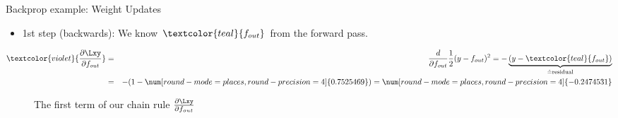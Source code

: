 \begin{vbframe}{Backprop example: Weight Updates}
  \begin{itemize}
    \item 1st step (backwards): We know $\textcolor{teal}{f_{out}}$ from the forward pass. 
  \end{itemize}
    \begin{eqnarray*}
      \textcolor{violet}{\frac{\partial \Lxy}{\partial f_{out}}} &=& \frac{d}{\partial f_{out}} \frac{1}{2}(y - f_{out})^2 = -\underbrace{(y - \textcolor{teal}{f_{out}})}_{\hat{=} \text{residual}} \\
       &=& -(1 - \num[round-mode=places,round-precision=4]{0.7525469}) = \num[round-mode=places,round-precision=4]{-0.2474531}
    \end{eqnarray*}
    \begin{figure}
      \centering
        \caption{The first term of our chain rule $\frac{\partial \Lxy}{\partial f_{out}}$}
    \end{figure}
\framebreak


\end{vbframe}

